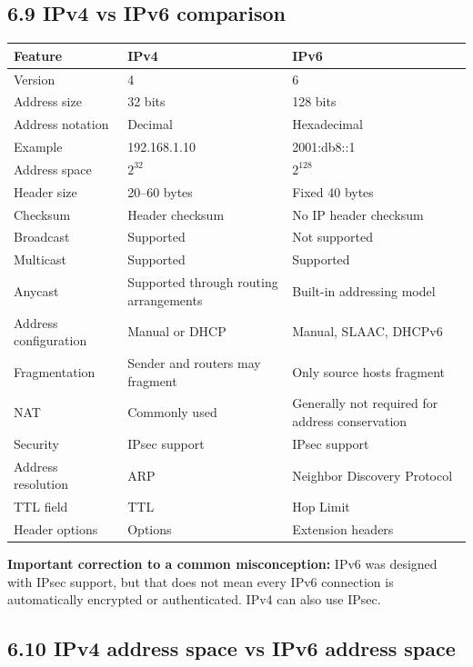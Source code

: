 \subsection{6.9 IPv4 vs IPv6 comparison}

\begin{table}[htbp]
\centering
\begin{tabularx}{\textwidth}{p{4.2cm} X X}
\toprule
\textbf{Feature} & \textbf{IPv4} & \textbf{IPv6} \\
\midrule
Version & 4 & 6 \\
Address size & 32 bits & 128 bits \\
Address notation & Decimal & Hexadecimal \\
Example & 192.168.1.10 & 2001:db8::1 \\
Address space & $2^{32}$ & $2^{128}$ \\
Header size & 20--60 bytes & Fixed 40 bytes \\
Checksum & Header checksum & No IP header checksum \\
Broadcast & Supported & Not supported \\
Multicast & Supported & Supported \\
Anycast & Supported through routing arrangements & Built-in addressing model \\
Address configuration & Manual or DHCP & Manual, SLAAC, DHCPv6 \\
Fragmentation & Sender and routers may fragment & Only source hosts fragment \\
NAT & Commonly used & Generally not required for address conservation \\
Security & IPsec support & IPsec support \\
Address resolution & ARP & Neighbor Discovery Protocol \\
TTL field & TTL & Hop Limit \\
Header options & Options & Extension headers \\
\bottomrule
\end{tabularx}
\end{table}

\textbf{Important correction to a common misconception:} IPv6 was designed with IPsec support, but that does not mean every IPv6 connection is automatically encrypted or authenticated. IPv4 can also use IPsec.

\subsection{6.10 IPv4 address space vs IPv6 address space}


